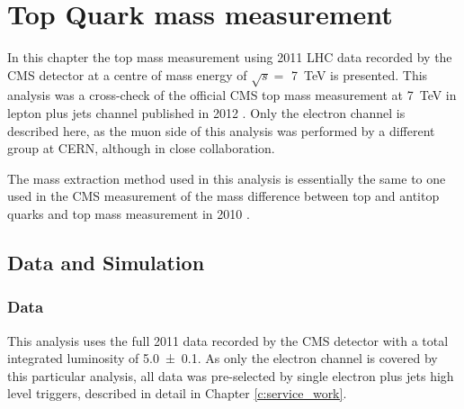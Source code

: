 
\chapter{Top Quark mass measurement}
\label{c:top_mass_analysis}
\ifpdf
    \graphicspath{{05_Mass_analysis/plots/}}
\else
    \graphicspath{{05_Mass_analysis/plots/EPS/}{05_Mass_analysis/plots/}}
\fi

In this chapter the top mass measurement using 2011 LHC data recorded by the CMS detector at a centre of mass energy of
$\sqrt s =$ \SI{7}{\TeV} is presented. This analysis was a cross-check of the official CMS top mass measurement at
\SI{7}{\TeV} in lepton plus jets channel published in 2012 \autocite{top_mass_ljets_CMS}. Only the electron channel is
described here, as the muon side of this analysis was performed by a different group at CERN, although in close
collaboration.

The mass extraction method used in this analysis is essentially the same to one used in the CMS measurement of the mass
difference between top and antitop quarks \autocite{mass_difference_CMS} and top mass measurement in 2010
\autocite{top_mass_ljets_CMS_2010}.


\section{Data and Simulation}
\label{s_top_mass:data_and_simulation}

\subsection{Data}
\label{ss_top_mass:data}
This analysis uses the full 2011 data recorded by the CMS detector with a total integrated luminosity of
\SI{5.0 \pm 0.1}{\fbinv}. As only the electron channel is covered by this particular analysis, all data was pre-selected
by single electron plus jets high level triggers, described in detail in Chapter \ref{c:service_work}.


